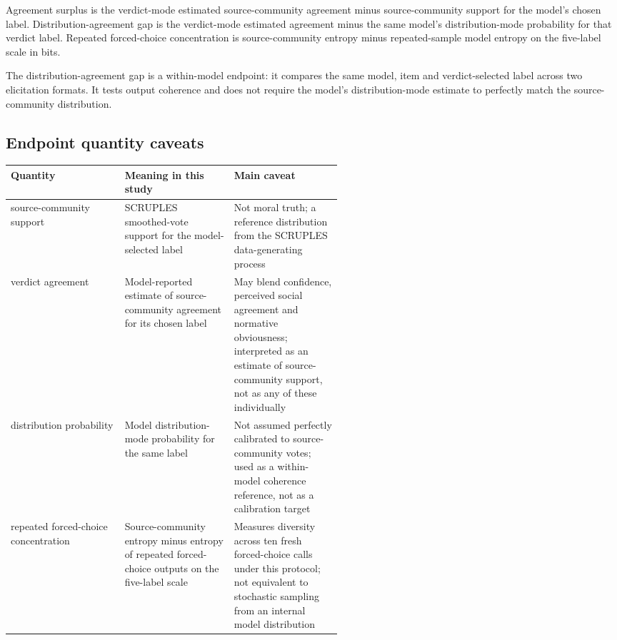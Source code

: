 \documentclass[11pt]{article}
\begin{document}
Agreement surplus is the verdict-mode estimated source-community agreement minus source-community support for the model's chosen label. Distribution-agreement gap is the verdict-mode estimated agreement minus the same model's distribution-mode probability for that verdict label. Repeated forced-choice concentration is source-community entropy minus repeated-sample model entropy on the five-label scale in bits.

The distribution-agreement gap is a within-model endpoint: it compares the same model, item and verdict-selected label across two elicitation formats. It tests output coherence and does not require the model's distribution-mode estimate to perfectly match the source-community distribution.

\subsection{Endpoint quantity caveats}

\begin{landscape}
\scriptsize
\setlength{\tabcolsep}{2pt}
\renewcommand{\arraystretch}{1.18}
\begin{longtable}{>{\raggedright\arraybackslash}p{0.18\linewidth}>{\raggedright\arraybackslash}p{0.18\linewidth}>{\raggedright\arraybackslash}p{0.18\linewidth}}
 \toprule
Quantity & Meaning in this study & Main caveat \\
 \midrule
source-community support & SCRUPLES smoothed-vote support for the model-selected label & Not moral truth; a reference distribution from the SCRUPLES data-generating process \\
verdict agreement & Model-reported estimate of source-community agreement for its chosen label & May blend confidence, perceived social agreement and normative obviousness; interpreted as an estimate of source-community support, not as any of these individually \\
distribution probability & Model distribution-mode probability for the same label & Not assumed perfectly calibrated to source-community votes; used as a within-model coherence reference, not as a calibration target \\
repeated forced-choice concentration & Source-community entropy minus entropy of repeated forced-choice outputs on the five-label scale & Measures diversity across ten fresh forced-choice calls under this protocol; not equivalent to stochastic sampling from an internal model distribution \\
 \bottomrule
\end{longtable}
\normalsize
\setlength{\tabcolsep}{6pt}
\renewcommand{\arraystretch}{1}
\end{landscape}
\end{document}
